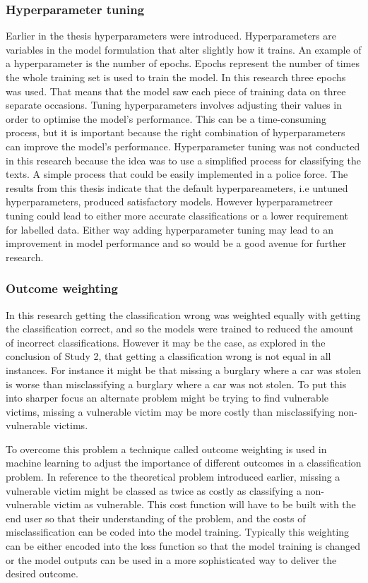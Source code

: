 \subsubsection{Hyperparameter tuning} Earlier in the thesis hyperparameters were introduced. Hyperparameters are variables in the model formulation that alter slightly how it trains. An example of a hyperparameter is the number of epochs. Epochs represent the number of times the whole training set is used to train the model. In this research three epochs was used. That means that the model saw each piece of training data on three separate occasions. Tuning hyperparameters involves adjusting their values in order to optimise the model's performance. This can be a time-consuming process, but it is important because the right combination of hyperparameters can improve the model's performance. Hyperparameter tuning was not conducted in this research because the idea was to use a simplified process for classifying the texts. A simple process that could be easily implemented in a police force.  The results from this thesis indicate that the default hyperpareameters, i.e untuned hyperparameters, produced satisfactory models. However hyperparametreer tuning could lead to either more accurate classifications or  a lower requirement for labelled data. Either way adding hyperparameter tuning may lead to an improvement in model performance and so would be a good avenue for further research. 

\subsubsection{Outcome weighting} In this research getting the classification wrong was weighted equally with getting the classification correct, and so the models were trained to reduced the amount of incorrect classifications. However it may be the case, as explored in the conclusion of Study 2, that getting a classification wrong is not equal in all instances. For instance it might be that missing a burglary where a car was stolen is worse than misclassifying a burglary where a car was not stolen. To put this into sharper focus an alternate problem might be trying to find vulnerable victims, missing a vulnerable victim may be more costly than misclassifying non-vulnerable victims. 

To overcome this problem a technique called outcome weighting is used in machine learning to adjust the importance of different outcomes in a classification problem. In reference to the theoretical problem introduced earlier, missing a vulnerable victim might be classed as twice as costly as classifying a non-vulnerable victim as vulnerable. This cost function will have to be built with the end user so that their understanding of the problem, and the costs of misclassification can be coded into the model training. Typically this weighting can be either encoded into the loss function so that the model training is changed or the model outputs can be used in a more sophisticated way to deliver the desired outcome.  


